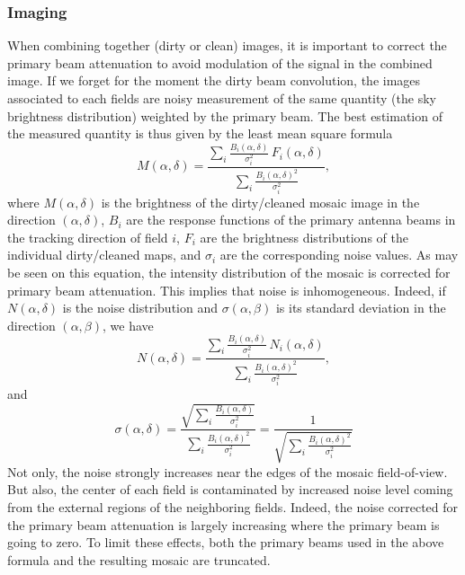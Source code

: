 \subsubsection{Imaging}

When combining together (dirty or clean) images, it is important to correct
the primary beam attenuation to avoid modulation of the signal in the
combined image. If we forget for the moment the dirty beam convolution, the
images associated to each fields are noisy measurement of the same quantity
(the sky brightness distribution) weighted by the primary beam. The best
estimation of the measured quantity is thus given by the least mean square
formula
\begin{equation}
  \label{eq:mosaic:signal}
  \displaystyle %
    M(\alpha,\delta) = \frac{\displaystyle\sum\nolimits_i \frac{B_i(\alpha,\delta)}{\sigma_i^2}\,F_i(\alpha,\delta)}
      {\displaystyle\sum\nolimits_i \frac{B_i(\alpha,\delta)^2}{\sigma_i^2}},
\end{equation}
where $M(\alpha,\delta)$ is the brightness of the dirty/cleaned mosaic
image in the direction $(\alpha,\delta)$, $B_i$ are the response functions
of the primary antenna beams in the tracking direction of field $i$, $F_i$
are the brightness distributions of the individual dirty/cleaned maps, and
$\sigma_i$ are the corresponding noise values. As may be seen on this
equation, the intensity distribution of the mosaic is corrected for primary
beam attenuation. This implies that noise is inhomogeneous. Indeed, if
$N(\alpha,\delta)$ is the noise distribution and $\sigma(\alpha,\beta)$ is
its standard deviation in the direction $(\alpha,\beta)$, we have
\begin{equation}
  \label{eq:mosaic:noise}
    N(\alpha,\delta) = \frac{\sum\nolimits_i \frac{B_i(\alpha,\delta)}{\sigma_i^2}\,N_i(\alpha,\delta)}
      {\sum\nolimits_i \frac{B_i(\alpha,\delta)^2}{\sigma_i^2}},
\end{equation}
and
\begin{equation}
  \label{eq:mosaic:sigma}
    \sigma(\alpha,\delta) = %
    \frac{\sqrt{\sum\nolimits_i \frac{B_i(\alpha,\delta)}{\sigma_i^2}}}
    {\sum\nolimits_i \frac{B_i(\alpha,\delta)^2}{\sigma_i^2}} = %
    \frac{1}{\sqrt{\sum\nolimits_i \frac{B_i(\alpha,\delta)^2}{\sigma_i^2}}}
\end{equation}
Not only, the noise strongly increases near the edges of the mosaic
field-of-view. But also, the center of each field is contaminated by
increased noise level coming from the external regions of the neighboring
fields. Indeed, the noise corrected for the primary beam attenuation is
largely increasing where the primary beam is going to zero. To limit these
effects, both the primary beams used in the above formula and the resulting
mosaic are truncated.

